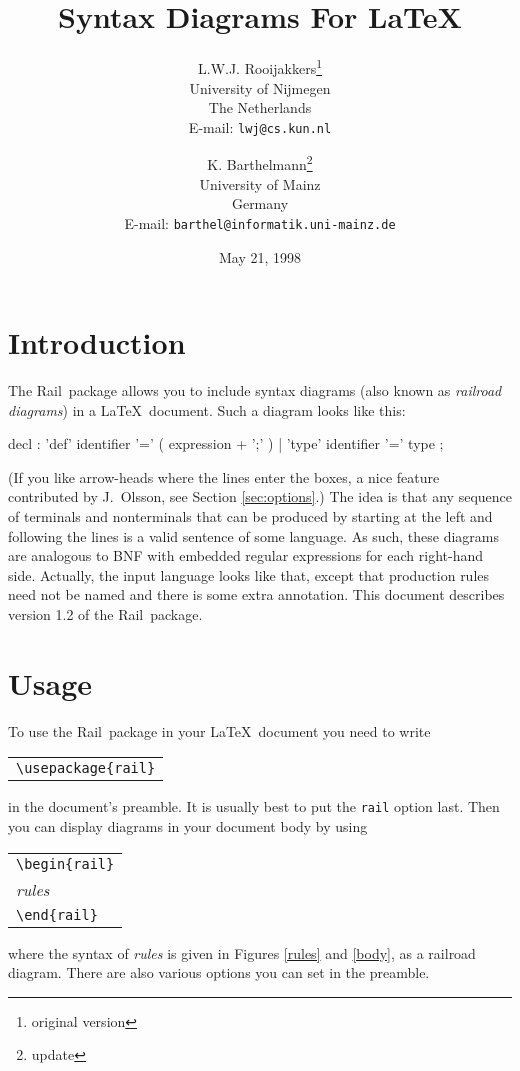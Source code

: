 \documentclass[a4paper]{article}
\title{
\Rail \\[1ex]
Syntax Diagrams For \LaTeX
}
\author{
   L.W.J. Rooijakkers\thanks{original version}
\\ University of Nijmegen
\\ The Netherlands
\\ E-mail: \texttt{lwj@cs.kun.nl}
\and
   K. Barthelmann\thanks{update}
\\ University of Mainz
\\ Germany
\\ E-mail: \texttt{barthel@informatik.uni-mainz.de}
}
\date{May 21, 1998}
\newcommand\Rail{Rail}
\newcommand\nt[1]{\textit{#1}}
\newcommand\lit[1]{\texttt{#1}}
\newenvironment{example}%
{\begin{trivlist}\item[]\begin{tabular}{l}}%
{\end{tabular}\end{trivlist}}
\begin{document}
\maketitle

\section{Introduction}

The \Rail\ package allows you to include syntax diagrams (also known as
\emph{railroad diagrams}) in a \LaTeX\ document. Such a diagram looks
like this:
\label{example}
\begin{rail}

decl : 'def' identifier '=' ( expression + ';' )
     | 'type' identifier '=' type
     ;

\end{rail}
(If you like arrow-heads where the lines enter the boxes, a nice feature
contributed by J.~Olsson, see Section \ref{sec:options}.)
The idea is that any sequence of terminals and nonterminals that can be
produced by starting at the left and following the lines is a valid sentence
of some language. As such, these diagrams are analogous to BNF with embedded
regular expressions for each right-hand side. Actually, the input
language looks like that, except that production rules need not be named
and there is some extra annotation. This document describes version 1.2
of the \Rail\ package.

\section{Usage}

To use the \Rail\ package in your \LaTeX\ document you need to write
\begin{example}
\verb!\usepackage{rail}!
\end{example}
in the document's preamble.
It is usually best to put the \lit{rail} option last. Then you can
display diagrams in your document body by using
\begin{example}
\verb!\begin{rail}! \\
\nt{rules} \\
\verb!\end{rail}!
\end{example}
where the syntax of \nt{rules} is given in Figures \ref{rules} and
\ref{body}, as a railroad diagram. There are also various options
you can set in the preamble.
\end{document}
